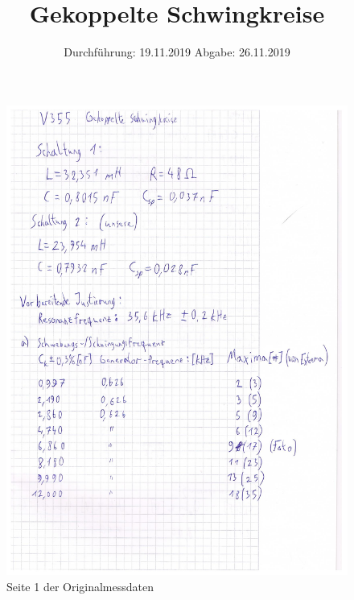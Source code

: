 

\subject{V355}
\title{Gekoppelte Schwingkreise}
\date{%
  Durchführung: 19.11.2019
  \hspace{3em}
  Abgabe: 26.11.2019
}



\maketitle
\thispagestyle{empty}
\tableofcontents
\newpage







\printbibliography{}

\begin{figure}
    \centering
    \includegraphics[width=\textwidth]{images/originaldaten_1.png}
    \caption{Seite 1 der Originalmessdaten}
    \label{fig:originaldaten_1}
\end{figure}
